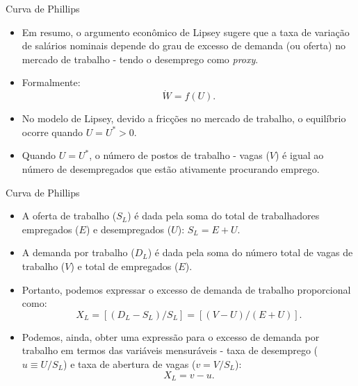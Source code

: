 \documentclass[10pt]{beamer}
\begin{document}
\begin{frame}{Curva de Phillips}
    \begin{itemize}
        \item Em resumo, o argumento econômico de Lipsey sugere que a taxa de variação de salários nominais depende do grau de excesso de demanda (ou oferta) no mercado de trabalho - tendo o desemprego como \emph{proxy}.
        \bigskip
        \item Formalmente:
        \begin{equation}
            \dot{W} = f(U).
            \label{eq6}
        \end{equation}
        \bigskip
        \item No modelo de Lipsey, devido a fricções no mercado de trabalho, o equilíbrio ocorre quando $U = U^*>0$.
        \bigskip
        \item Quando $U = U^*$, o número de postos de trabalho - vagas ($V$) é igual ao número de desempregados que estão ativamente procurando emprego.
    \end{itemize}
\end{frame}

\begin{frame}{Curva de Phillips}
    \begin{itemize}
        \item A oferta de trabalho ($S_L$) é dada pela soma do total de trabalhadores empregados ($E$) e desempregados ($U$): $S_L = E + U$.
        \bigskip
        \item A demanda por trabalho ($D_L$) é dada pela soma do número total de vagas de trabalho ($V$) e total de empregados ($E$).
        \bigskip
        \item Portanto, podemos expressar o excesso de demanda de trabalho proporcional como:
        \begin{equation}
            X_L = [(D_L - S_L)/S_L] = [(V-U)/(E + U)].
            \label{eq7}
        \end{equation}
        \bigskip
        \item Podemos, ainda, obter uma expressão para o excesso de demanda por trabalho em termos das variáveis mensuráveis - taxa de desemprego ($u\equiv U/S_L$) e taxa de abertura de vagas ($v = V/S_L$):
        \begin{equation}
            X_L = v - u.
            \label{eq8}
        \end{equation}
    \end{itemize}
\end{frame}
\end{document}
